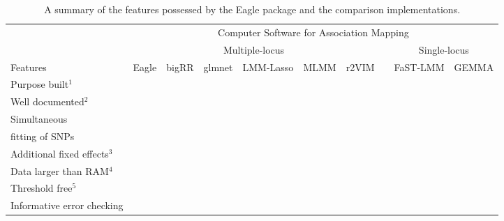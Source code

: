 \documentclass[10pt]{article}
\newcommand{\cmark}{\ding{51}}%
\newcommand{\xmark}{\ding{55}}%
\begin{document}
\begin{table}
\caption{A summary of the features possessed by the Eagle package and the comparison implementations.}
\begin{tabular}{lccccccccc}
                                &  \multicolumn{9}{c}{Computer Software for Association Mapping} \\ \cline{2-10}
                                 & \multicolumn{6}{c}{Multiple-locus}  & & \multicolumn{2}{c}{Single-locus} \\  \cline{2-7}   \cline{9-10}
 Features                 & Eagle  & bigRR & glmnet & LMM-Lasso & MLMM & r2VIM     & & FaST-LMM & GEMMA \\  \hline
Purpose built$^1$    &   \cmark     &    \cmark      &  \xmark   &  \cmark  &  \cmark  &  \cmark && \cmark & \cmark           \\ [0.2cm]
Well documented$^2$           & \cmark &   \xmark   & \cmark   & \xmark     &   \cmark     & \xmark          && \cmark    &    \cmark    \\  [0.2cm]
Simultaneous   &    \cmark     &    \cmark        &   \cmark          &      \cmark             &  \xmark          &  \xmark              &&   \xmark   &  \xmark     \\  
fitting of SNPs     &         &            &             &                   &            &                &&      &      \\  [0.2cm]
Additional fixed effects$^3$          &   \cmark   &      \cmark      &     \cmark    &  \xmark                 &      \cmark      &      \cmark          &&      \cmark & \cmark     \\   [0.2cm]
Data larger than RAM$^4$                   &   \cmark    &      \xmark      & \xmark          &  \xmark    &  \xmark    &   \xmark     && \cmark      & \xmark    \\  [0.2cm]
Threshold free$^5$        &    \cmark     &  \xmark    &  \xmark         &    \xmark               &     \cmark       &  \xmark              &&  \xmark   & \xmark      \\  [0.2cm]
Informative error checking           &  \cmark      &     \xmark        &      \xmark     &           \xmark        &      \xmark       &         \xmark       && \cmark  & \xmark \\ \hline


\end{tabular}
\end{table}
\end{document}
